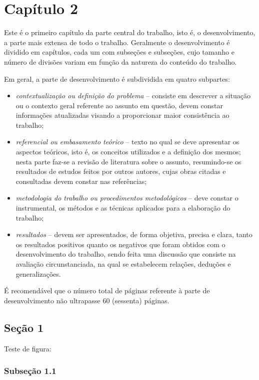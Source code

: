 \chapter{Capítulo 2}

Este é o primeiro capítulo da parte central do trabalho, isto é, o desenvolvimento, a parte mais extensa de todo o trabalho. Geralmente o desenvolvimento é dividido em capítulos, cada um com subseções e subseções, cujo tamanho e número de divisões variam em função da natureza do conteúdo do trabalho.

Em geral, a parte de desenvolvimento é subdividida em quatro subpartes:
\begin{itemize}
	\item \textit{contextualização ou definição do problema} -- consiste em descrever a situação ou o contexto geral referente ao assunto em questão, devem constar informações atualizadas visando a proporcionar maior consistência ao trabalho;
	\item \textit{referencial ou embasamento teórico} -- texto no qual se deve apresentar os aspectos teóricos, isto é, os conceitos utilizados e a definição dos mesmos; nesta parte faz-se a revisão de literatura sobre o assunto, resumindo-se os resultados de estudos feitos por outros autores, cujas obras citadas e consultadas devem constar nas referências;
	\item \textit{metodologia do trabalho ou procedimentos metodológicos} -- deve constar o instrumental, os métodos e as técnicas aplicados para a elaboração do trabalho;
	\item \textit{resultados} -- devem ser apresentados, de forma objetiva, precisa e clara, tanto os resultados positivos quanto os negativos que foram obtidos com o desenvolvimento do trabalho, sendo feita uma discussão que consiste na avaliação circunstanciada, na qual se estabelecem relações, deduções e generalizações.
\end{itemize}

É recomendável que o número total de páginas referente à parte de desenvolvimento não ultrapasse 60 (sessenta) páginas.

\section{Seção 1}

Teste de figura:

\subsection{Subseção 1.1}

